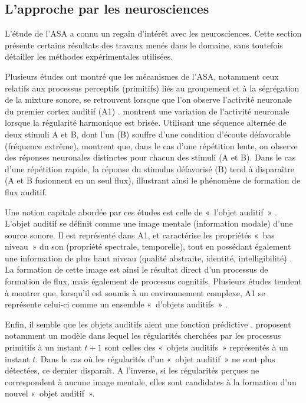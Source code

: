 \subsection{L'approche par les neurosciences}
\label{sec:ch3_asaNeuro}

L'étude de l'ASA a connu un regain d'intérêt avec les neurosciences. Cette section présente certains résultats des travaux menés dans le domaine, sans toutefois détailler les méthodes expérimentales utilisées.

Plusieurs études ont montré que les mécanismes de l'ASA, notamment ceux relatifs aux processus perceptifs (primitifs) liés au groupement et à la ségrégation de la mixture sonore, se retrouvent lorsque que l'on observe l'activité neuronale du premier cortex auditif (A1) \citep{nelken2004processing,carlyon2004brain,snyder2007toward}. \citep{dyson2004representation} montrent une variation de l'activité neuronale lorsque la régularité harmonique est brisée. Utilisant une séquence alternée de deux stimuli A et B, dont l'un (B) souffre d'une condition d'écoute défavorable (fréquence extrême), \citep{fishman2001neural} montrent que, dans le cas d'une répétition lente, on observe des réponses neuronales distinctes pour chacun des stimuli (A et B). Dans le cas d'une répétition rapide, la réponse du stimulus défavorisé (B) tend à disparaître (A et B fusionnent en un seul flux), illustrant ainsi le phénomène de formation de flux auditif.
   
Une notion capitale abordée par ces études est celle de «~l'objet auditif~» \citep{nelken2004processing}. L'objet auditif se définit comme une image mentale (information modale) d'une source sonore. Il est représenté dans A1, et caractérise les propriétés «~bas niveau~» du son (propriété spectrale, temporelle), tout en possédant également une information de plus haut niveau (qualité abstraite, identité, intelligibilité) \citep{nelken2008neurons}. La formation de cette image est ainsi le résultat direct d'un processus de formation de flux, mais également de processus cognitifs. Plusieurs études tendent à montrer que, lorsqu'il est soumis à un environnement complexe, A1 se représente celui-ci comme un ensemble «~d'objets auditifs~» \citep{kocsis2016promoting}.

Enfin, il semble que les objets auditifs aient une fonction prédictive \citep{winkler2015auditory}. \citep{winkler2009modeling} proposent notamment un modèle dans lequel les régularités cherchées par les processus primitifs à un instant $t+1$ sont celles des «~objets auditifs~» représentés à un instant $t$. Dans le cas où les régularités d'un «~objet auditif~» ne sont plus détectées, ce dernier disparaît. A l'inverse, si les régularités perçues ne correspondent à aucune image mentale, elles sont candidates à la formation d'un nouvel «~objet auditif~».

